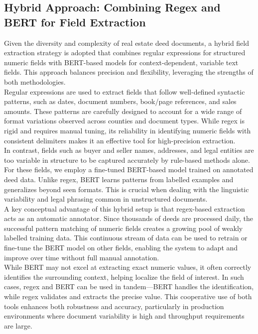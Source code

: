 \documentclass{article}
\begin{document}
\subsection{Hybrid Approach: Combining Regex and BERT for Field Extraction}

Given the diversity and complexity of real estate deed documents, a hybrid field extraction strategy is adopted that combines regular expressions for structured numeric fields with BERT-based models for context-dependent, variable text fields. This approach balances precision and flexibility, leveraging the strengths of both methodologies. \\

Regular expressions are used to extract fields that follow well-defined syntactic patterns, such as dates, document numbers, book/page references, and sales amounts. These patterns are carefully designed to account for a wide range of format variations observed across counties and document types. While regex is rigid and requires manual tuning, its reliability in identifying numeric fields with consistent delimiters makes it an effective tool for high-precision extraction. \\

In contrast, fields such as buyer and seller names, addresses, and legal entities are too variable in structure to be captured accurately by rule-based methods alone. For these fields, we employ a fine-tuned BERT-based model trained on annotated deed data. Unlike regex, BERT learns patterns from labelled examples and generalizes beyond seen formats. This is crucial when dealing with the linguistic variability and legal phrasing common in unstructured documents. \\

A key conceptual advantage of this hybrid setup is that regex-based extraction acts as an automatic annotator. Since thousands of deeds are processed daily, the successful pattern matching of numeric fields creates a growing pool of weakly labelled training data. This continuous stream of data can be used to retrain or fine-tune the BERT model on other fields, enabling the system to adapt and improve over time without full manual annotation. \\

While BERT may not excel at extracting exact numeric values, it often correctly identifies the surrounding context, helping localize the field of interest. In such cases, regex and BERT can be used in tandem—BERT handles the identification, while regex validates and extracts the precise value. This cooperative use of both tools enhances both robustness and accuracy, particularly in production environments where document variability is high and throughput requirements are large. \\
\end{document}
